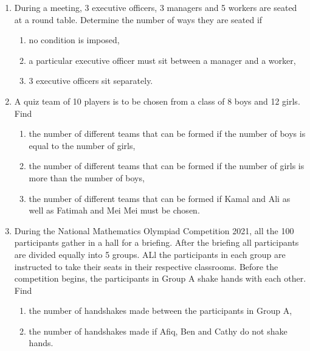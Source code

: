 \documentclass{report}
\begin{document}
\begin{multicols*}{2}
\begin{enumerate}
            \item During a meeting, 3 executive officers, 3 managers and 5 workers are seated at
                  a round table. Determine the number of ways they are seated if
                  \begin{enumerate}
                        \item no condition is imposed,
                        \item a particular executive officer must sit between a manager and a worker,
                        \item 3 executive officers sit separately.
                  \end{enumerate}

            \item A quiz team of 10 players is to be chosen from a class of 8 boys and 12 girls.
                  Find
                  \begin{enumerate}
                        \item the number of different teams that can be formed if the number of boys is equal
                              to the number of girls,
                        \item the number of different teams that can be formed if the number of girls is more
                              than the number of boys,
                        \item the number of different teams that can be formed if Kamal and Ali as well as
                              Fatimah and Mei Mei must be chosen.
                  \end{enumerate}

            \item During the National Mathematics Olympiad Competition 2021, all the 100
                  participants gather in a hall for a briefing. After the briefing all
                  participants are divided equally into 5 groups. ALl the participants in each
                  group are instructed to take their seats in their respective classrooms. Before
                  the competition begins, the participants in Group A shake hands with each
                  other. Find
                  \begin{enumerate}
                        \item the number of handshakes made between the participants in Group A,
                        \item the number of handshakes made if Afiq, Ben and Cathy do not shake hands.
                  \end{enumerate}
      \end{enumerate}
\end{multicols*}
\end{document}
